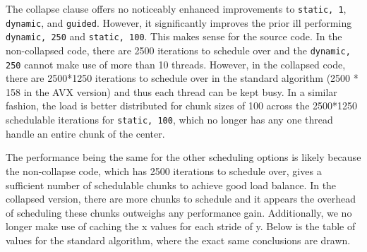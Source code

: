 \documentclass{article}
\begin{document}
\noindent The collapse clause offers no noticeably enhanced improvements to \texttt{static, 1}, \texttt{dynamic}, and \texttt{guided}. 
However, it significantly improves the prior ill performing \texttt{dynamic, 250} and \texttt{static, 100}.
This makes sense for the source code. In the non-collapsed code, there are 2500 
iterations to schedule over and the \texttt{dynamic, 250} cannot make use of more than 10 threads. 
However, in the collapsed code, there are 2500*1250 iterations to schedule over in the standard 
algorithm (2500 * 158 in the AVX version) and thus each thread can be kept busy. 
In a similar fashion, the load is better distributed for chunk sizes of 100 across the 2500*1250 schedulable 
iterations for \texttt{static, 100}, which no longer has any one thread handle an entire chunk of the center.

The performance being the same for the other scheduling options is likely because the non-collapse code, 
which has 2500 iterations to schedule over, gives a sufficient number of 
schedulable chunks to achieve good load balance. In the collapsed version, there 
are more chunks to schedule and it appears the overhead of scheduling these chunks 
outweighs any performance gain. Additionally, we no longer make use of caching the x values for each stride of y. 
Below is the table of values for the standard algorithm, where the exact same conclusions are drawn.
\end{document}
